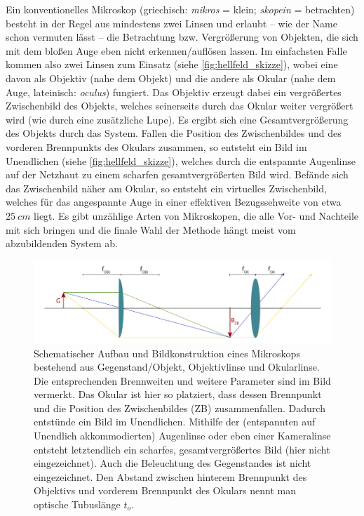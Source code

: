 \documentclass[ngerman]{scrartcl}
\begin{document}
Ein konventionelles Mikroskop (griechisch: \textit{mikros} = klein; \textit{skopein} = betrachten) besteht in der Regel aus mindestens zwei Linsen und erlaubt -- wie der Name schon vermuten lässt -- die Betrachtung bzw. Vergrößerung von Objekten, die sich mit dem bloßen Auge eben nicht erkennen/auflösen lassen. Im einfachsten Falle kommen also zwei Linsen zum Einsatz (siehe \autoref{fig:hellfeld_skizze}), wobei eine davon als Objektiv (nahe dem Objekt) und die andere als Okular (nahe dem Auge, lateinisch: \textit{oculus}) fungiert. Das Objektiv erzeugt dabei ein vergrößertes Zwischenbild des Objekts, welches seinerseits durch das Okular weiter vergrößert wird (wie durch eine zusätzliche Lupe). Es ergibt sich eine Gesamtvergrößerung des Objekts durch das System. Fallen die Position des Zwischenbildes und des vorderen Brennpunkts des Okulars zusammen, so entsteht ein Bild im Unendlichen (siehe \autoref{fig:hellfeld_skizze}), welches durch die entspannte Augenlinse auf der Netzhaut zu einem scharfen gesamtvergrößerten Bild wird. Befände sich das Zwischenbild näher am Okular, so entsteht ein virtuelles Zwischenbild, welches für das angespannte Auge in einer effektiven Bezugssehweite von etwa $\SI{25}{cm}$ liegt. Es gibt unzählige Arten von Mikroskopen, die alle Vor- und Nachteile mit sich bringen und die finale Wahl der Methode hängt meist vom abzubildenden System ab.
%
\begin{figure}[H]
    \centering
    \begin{samepage}
        \includegraphics[width=\linewidth]{fig/Hellfeld.png}
        \caption[Aufbau eines Hellfeld-Transmissionsmikroskops]{Schematischer Aufbau und Bildkonstruktion eines Mikroskops bestehend aus Gegenstand/Objekt, Objektivlinse und Okularlinse. Die entsprechenden Brennweiten und weitere Parameter sind im Bild vermerkt. Das Okular ist hier so platziert, dass dessen Brennpunkt und die Position des Zwischenbildes (ZB) zusammenfallen. Dadurch entstünde ein Bild im Unendlichen. Mithilfe der (entspannten auf Unendlich akkommodierten) Augenlinse oder eben einer Kameralinse entsteht letztendlich ein scharfes, gesamtvergrößertes Bild (hier nicht eingezeichnet). Auch die Beleuchtung des Gegenstandes ist nicht eingezeichnet. Den Abstand zwischen hinterem Brennpunkt des Objektivs und vorderem Brennpunkt des Okulars nennt man optische Tubuslänge $t_o$.}
        \label{fig:hellfeld_skizze}
    \end{samepage}
\end{figure}
%
\end{document}

